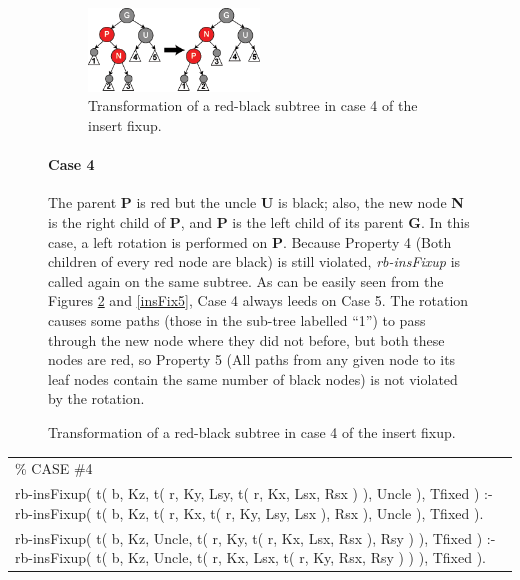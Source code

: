 \documentclass{article}
\newenvironment{code}{\obeycr\begin{it}\nopagebreak\addvspace{1ex}\noindent\footnotesize\begin{tabular}{|p{0.95\textwidth}|}\hline}{\\\hline\end{tabular}\par\addvspace{1ex}\end{it}\restorecr}
\newcommand{\inlinecode}[1]{\textit{#1}}
\begin{document}
\begin{figure}[h]

  \begin{figure}
    \includegraphics[width=0.5\textwidth]{Red-black_tree_insert_case_4}
	\caption{Transformation of a red-black subtree in case 4 of the insert fixup.}
    \label{insFix4}
  \end{figure}	
  \paragraph{Case 4}
  The parent \textbf{P} is red but the uncle \textbf{U} is black; also, the new node \textbf{N} is the right child of \textbf{P}, and \textbf{P} is the left child of its parent \textbf{G}. In this case, a left rotation is performed on \textbf{P}. Because Property 4 (Both children of every red node are black) is still violated, \inlinecode{rb-insFixup} is called again on the same subtree. As can be easily seen from the Figures \ref{insFix4} and \ref{insFix5}, Case 4 always leeds on Case 5. The rotation causes some paths (those in the sub-tree labelled ``1'') to pass through the new node where they did not before, but both these nodes are red, so Property 5 (All paths from any given node to its leaf nodes contain the same number of black nodes) is not violated by the rotation.
\end{figure}

\begin{code}
\% CASE \#4\\
rb-insFixup( t( b, Kz, t( r, Ky, Lsy, t( r, Kx, Lsx, Rsx ) ), Uncle ), Tfixed ) :-
\hspace{2ex}rb-insFixup( t( b, Kz, t( r, Kx, t( r, Ky, Lsy, Lsx ), Rsx ), Uncle ), Tfixed ).\\
rb-insFixup( t( b, Kz, Uncle, t( r, Ky, t( r, Kx, Lsx, Rsx ), Rsy ) ), Tfixed ) :-
\hspace{2ex}rb-insFixup( t( b, Kz, Uncle, t( r, Kx, Lsx, t( r, Ky, Rsx, Rsy ) ) ), Tfixed ).
\end{code}
\end{document}
